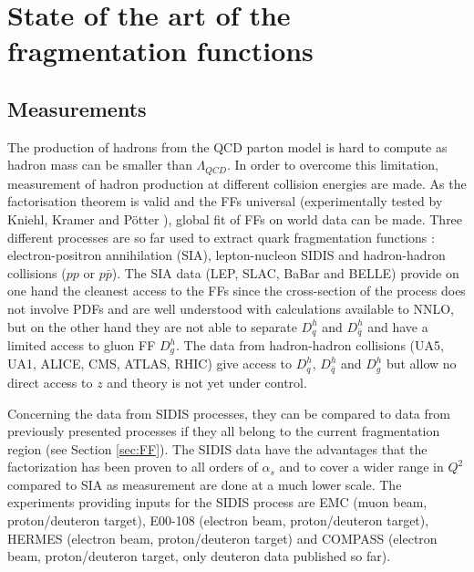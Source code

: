 
\section{State of the art of the fragmentation functions}

\subsection{Measurements}

The production of hadrons from the QCD parton model is hard to compute as hadron mass can be smaller than $\Lambda_{QCD}$. In order to overcome this limitation, measurement of hadron production at different collision energies are made. As the factorisation theorem is valid and the FFs universal (experimentally tested by Kniehl, Kramer and Pötter \cite{Universality}), global fit of FFs on world data can be made.
Three different processes are so far used to extract quark fragmentation functions : electron-positron annihilation (SIA), lepton-nucleon SIDIS and hadron-hadron collisions ($pp$ or $p\bar{p}$). The SIA data (LEP\cite{LEP}, SLAC\cite{SLAC}, BaBar\cite{BABAR} and BELLE\cite{BELLE}) provide on one hand the cleanest access to the FFs since the cross-section of the process does not involve PDFs and are well understood with calculations available to NNLO, but on the other hand they are not able to separate $D^h_q$ and $D^h_{\bar{q}}$ and have a limited access to gluon FF $D^h_g$. The data from hadron-hadron collisions (UA5\cite{UA5}, UA1\cite{UA1}, ALICE\cite{ALICE}, CMS\cite{CMS}, ATLAS\cite{ATLAS}, RHIC\cite{RHIC}) give access to $D^h_q$, $D^h_{\bar{q}}$ and $D^h_g$ but allow no direct access to $z$ and theory is not yet under control.

Concerning the data from SIDIS processes, they can be compared to data from previously presented processes if they all belong to the current fragmentation region (see Section \ref{sec:FF}). The SIDIS data have the advantages that the factorization has been proven to all orders of $\alpha_s$ and to cover a wider range in $Q^2$ compared to SIA as measurement are done at a much lower scale. The experiments providing inputs for the SIDIS process are EMC\cite{EMC} (muon beam, proton/deuteron target), E00-108\cite{E00108} (electron beam, proton/deuteron target), HERMES\cite{HERMES} (electron beam, proton/deuteron target) and COMPASS (electron beam, proton/deuteron target, only deuteron data published so far\cite{COMPASS2006}).

